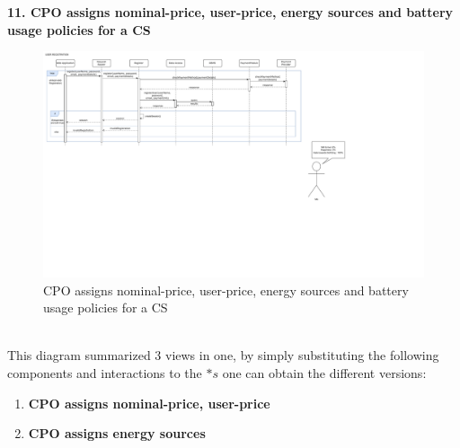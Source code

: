 \documentclass[11pt]{article}
\begin{document}
\begin{description}
    \item \textbf{11. CPO assigns nominal-price, user-price, energy sources and battery usage policies for a CS} \\
    \begin{figure}[!ht]
        \centering
        \includegraphics[page={11}, trim=0cm 4cm 1cm 1cm, width=\linewidth, clip]{RuntimeDiagrams.pdf}
        \caption{CPO assigns nominal-price, user-price, energy sources and battery usage policies for a CS}
    \end{figure} \\
    This diagram summarized 3 views in one, by simply substituting the following components and interactions to the $\ast s$ one can obtain the different versions:
    \begin{enumerate}
        \item \textbf{CPO assigns nominal-price, user-price}
        \item \textbf{CPO assigns energy sources}
\end{enumerate}
\end{description}
\end{document}
